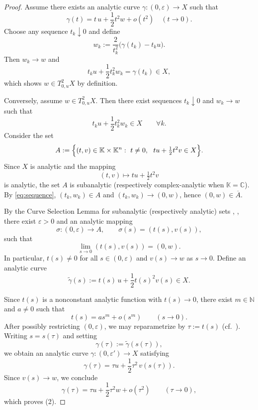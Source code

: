 \documentclass[10pt,reqno]{amsart}
\theoremstyle{break-italic}
\theoremstyle{break-italic}
\theoremstyle{break-italic}
\theoremstyle{break-italic}
\theoremstyle{break-italic}
\theoremstyle{break-italic}
\theoremstyle{break-italic}
\theoremstyle{break-italic}
\theoremstyle{break-roman}
\theoremstyle{standard}
\theoremstyle{varthm-roman}
\theoremstyle{varthm-italic}
\theoremstyle{varthm-roman-break}
\theoremstyle{varthm-italic-break}
\theoremstyle{varthm-roman-no-punctuation}
\theoremstyle{varthm-italic-no-punctuation}
\numberwithin{equation}{section}
\begin{document}
\begin{proof} Assume there exists an analytic curve $\gamma: (0,\varepsilon)\to X$ such that
\[
\gamma(t)=t\,u+\frac12 t^2 w+o(t^2)\quad (t\to 0).
\]
Choose any sequence $t_k\downarrow 0$ and define
\[
w_k:=\frac{2}{t_k^2}\bigl(\gamma(t_k)-t_k u\bigr).
\]
Then $w_k\to w$ and
\[
t_k u+\frac12 t_k^2 w_k=\gamma(t_k)\in X,
\]
which shows $w\in T^2_{0,u}X$ by definition.

\medskip

Conversely, assume $w\in T^2_{0,u}X$. Then there exist sequences $t_k\downarrow 0$ and $w_k\to w$ such that
\begin{equation}\label{eq:sequence}
t_k u+\frac12 t_k^2 w_k\in X\qquad \forall k.
\end{equation}
Consider the set
\[
A:=\Bigl\{(t,v)\in \mathbb  K\times \mathbb K^n:\ t\neq 0,\ \ t u+\tfrac12 t^2 v\in X\Bigr\}.
\]
Since $X$ is analytic and the mapping
\[
(t,v)\longmapsto t u+\tfrac12 t^2 v
\]
is analytic, the set $A$ is subanalytic (respectively complex-analytic when $\mathbb K=\mathbb C$).
By \eqref{eq:sequence}, $(t_k,w_k)\in A$ and $(t_k,w_k)\to (0,w)$, hence $(0,w)\in\overline{A}$.

By the Curve Selection Lemma for subanalytic (respectively analytic) sets
\cite[Th\'eor\`eme~1]{Lo95},
\cite[\S3]{Mil68},
there exist $\varepsilon>0$ and an analytic mapping
\[
\sigma:(0,\varepsilon)\to A,\qquad \sigma(s)=(t(s),v(s)),
\]
such that
\[
\lim_{s\to 0}(t(s),v(s))=(0,w).
\]
In particular, $t(s)\neq 0$ for all $s\in(0,\varepsilon)$ and $v(s)\to w$ as $s\to 0$.
Define an analytic curve
\[
\tilde\gamma(s):=t(s)\,u+\frac12 t(s)^2 v(s)\in X.
\]

Since $t(s)$ is a nonconstant analytic function with $t(s)\to 0$, there exist
$m\in\mathbb N$ and $a\neq 0$ such that
\[
t(s)=a s^m+o(s^m)\qquad (s\to 0).
\]
After possibly restricting $(0,\varepsilon)$, we may reparametrize by $\tau:=t(s)$
(cf.\ \cite[p.~27]{Mil68}). Writing $s=s(\tau)$ and setting
\[
\gamma(\tau):=\tilde\gamma(s(\tau)),
\]
we obtain an analytic curve $\gamma:(0,\varepsilon')\to X$ satisfying
\[
\gamma(\tau)=\tau u+\frac12 \tau^2\,v(s(\tau)).
\]
Since $v(s)\to w$, we conclude
\[
\gamma(\tau)=\tau u+\frac12 \tau^2 w+o(\tau^2)\qquad (\tau\to 0),
\]
which proves \textup{(2)}.
\end{proof}
\end{document}
